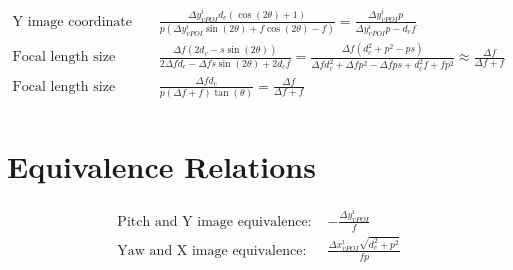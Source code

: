 \begin{align*}
\text{Y image coordinate size error (lateral): }&\frac{\Delta{y^i_{vPOI}} d_{c} \left(\cos{\left(2 \theta \right)} + 1\right)}{p \left(\Delta{y^i_{vPOI}} \sin{\left(2 \theta \right)} + f \cos{\left(2 \theta \right)} - f\right)} = \frac{\Delta{y^i_{vPOI}} p}{\Delta{y^i_{vPOI}} p - d_{c} f} \\
\text{Focal length size error (longitudinal): }&\frac{\Delta{f} \left(2 d_{c} - s \sin{\left(2 \theta \right)}\right)}{2 \Delta{f} d_{c} - \Delta{f} s \sin{\left(2 \theta \right)} + 2 d_{c} f} = \frac{\Delta{f} \left(d_{c}^{2} + p^{2} - p s\right)}{\Delta{f} d_{c}^{2} + \Delta{f} p^{2} - \Delta{f} p s + d_{c}^{2} f + f p^{2}} \approx \frac{\Delta{f}}{\Delta{f} + f} \\
\text{Focal length size error (lateral): }&\frac{\Delta{f} d_{c}}{p \left(\Delta{f} + f\right) \tan{\left(\theta \right)}} = \frac{\Delta{f}}{\Delta{f} + f} \\
\end{align*}
\section{Equivalence Relations}
\begin{align*}
\text{Pitch and Y image equivalence: }&- \frac{\Delta{y^i_{vPOI}}}{f} \\
\text{Yaw and X image equivalence: }&\frac{\Delta{x^i_{vPOI}} \sqrt{d_{c}^{2} + p^{2}}}{f p} \\
\end{align*}
